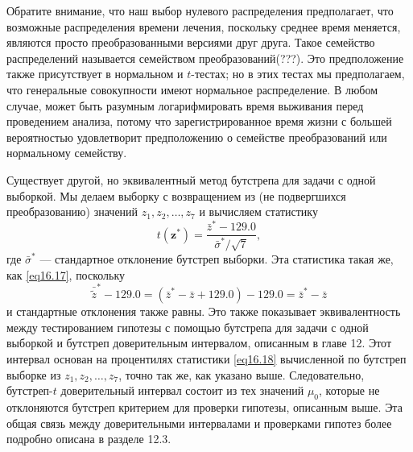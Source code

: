 Обратите внимание, что наш выбор нулевого распределения предполагает, что возможные распределения времени лечения, поскольку среднее время меняется, являются просто преобразованными версиями друг друга. Такое семейство распределений называется семейством преобразований(???). Это предположение также присутствует в нормальном и $t$-тестах; но в этих тестах мы предполагаем, что генеральные совокупности имеют нормальное распределение. В любом случае, может быть разумным логарифмировать время выживания перед проведением анализа, потому что зарегистрированное время жизни с большей вероятностью удовлетворит предположению о семействе преобразований или нормальному семейству.

Существует другой, но эквивалентный метод бутстрепа для задачи с одной выборкой. Мы делаем выборку с возвращением из (не подвергшихся преобразованию) значений $z_1, z_2, \ldots, z_7$ и вычисляем статистику
\begin{equation}\label{eq16.18}
    t(\mathbf{z}^{*}) = \frac{\bar{z}^{*}-129.0}{\bar{\sigma}^{*}/\sqrt{7}},
\end{equation}
где $\bar{\sigma}^{*}$ --- стандартное отклонение бутстреп выборки. Эта статистика такая же, как \ref{eq16.17}, поскольку
\begin{equation*}
    \bar{\widetilde{z}}^{*} - 129.0 = (\bar{z}^{*} - \bar{z} + 129.0) - 129.0 = \bar{z}^{*} - \bar{z} 
\end{equation*}
и стандартные отклонения также равны. Это также показывает эквивалентность между тестированием гипотезы с помощью бутстрепа для задачи с одной выборкой и бутстреп доверительным интервалом, описанным в главе 12. Этот интервал основан на процентилях статистики \ref{eq16.18} вычисленной по  бутстреп выборке из $z_1, z_2, \ldots, z_7$, точно так же, как указано выше. Следовательно, бутстреп-$t$ доверительный интервал состоит из тех значений $\mu_0$, которые не отклоняются бутстреп критерием для проверки гипотезы, описанным выше. Эта общая связь между доверительными интервалами и проверками гипотез более подробно описана в разделе 12.3.

